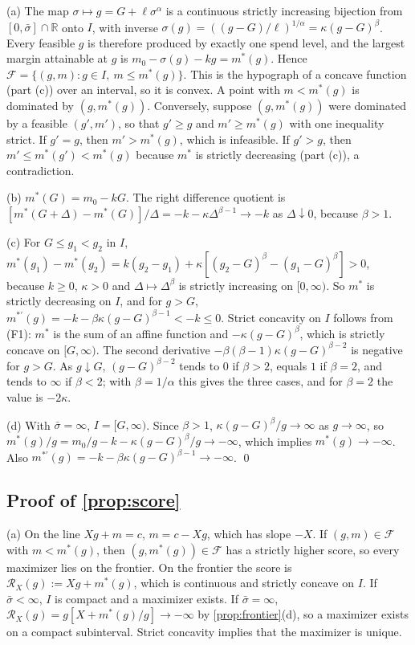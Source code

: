 (a) The map $\sigma\mapsto g=G+\ell\sigma^{\alpha}$ is a continuous strictly increasing bijection from $[0,\bar\sigma]\cap\mathbb R$ onto $I$, with inverse $\sigma(g)=((g-G)/\ell)^{1/\alpha}=\kappa(g-G)^{\beta}$. Every feasible $g$ is therefore produced by exactly one spend level, and the largest margin attainable at $g$ is $m_0-\sigma(g)-kg=m^*(g)$. Hence $\mathcal F=\{(g,m):g\in I,\ m\le m^*(g)\}$. This is the hypograph of a concave function (part (c)) over an interval, so it is convex. A point with $m<m^*(g)$ is dominated by $(g,m^*(g))$. Conversely, suppose $(g,m^*(g))$ were dominated by a feasible $(g',m')$, so that $g'\ge g$ and $m'\ge m^*(g)$ with one inequality strict. If $g'=g$, then $m'>m^*(g)$, which is infeasible. If $g'>g$, then $m'\le m^*(g')<m^*(g)$ because $m^*$ is strictly decreasing (part (c)), a contradiction.

(b) $m^*(G)=m_0-kG$. The right difference quotient is $[m^*(G+\Delta)-m^*(G)]/\Delta=-k-\kappa\Delta^{\beta-1}\to -k$ as $\Delta\downarrow 0$, because $\beta>1$.

(c) For $G\le g_1<g_2$ in $I$, $m^*(g_1)-m^*(g_2)=k(g_2-g_1)+\kappa[(g_2-G)^{\beta}-(g_1-G)^{\beta}]>0$, because $k\ge 0$, $\kappa>0$ and $\Delta\mapsto\Delta^{\beta}$ is strictly increasing on $[0,\infty)$. So $m^*$ is strictly decreasing on $I$, and for $g>G$, $m^{*\prime}(g)=-k-\beta\kappa(g-G)^{\beta-1}<-k\le 0$. Strict concavity on $I$ follows from (F1): $m^*$ is the sum of an affine function and $-\kappa(g-G)^{\beta}$, which is strictly concave on $[G,\infty)$. The second derivative $-\beta(\beta-1)\kappa(g-G)^{\beta-2}$ is negative for $g>G$. As $g\downarrow G$, $(g-G)^{\beta-2}$ tends to $0$ if $\beta>2$, equals $1$ if $\beta=2$, and tends to $\infty$ if $\beta<2$; with $\beta=1/\alpha$ this gives the three cases, and for $\beta=2$ the value is $-2\kappa$.

(d) With $\bar\sigma=\infty$, $I=[G,\infty)$. Since $\beta>1$, $\kappa(g-G)^{\beta}/g\to\infty$ as $g\to\infty$, so $m^*(g)/g=m_0/g-k-\kappa(g-G)^{\beta}/g\to-\infty$, which implies $m^*(g)\to-\infty$. Also $m^{*\prime}(g)=-k-\beta\kappa(g-G)^{\beta-1}\to-\infty$. \qed

\subsection*{Proof of \autoref{prop:score}}

(a) On the line $Xg+m=c$, $m=c-Xg$, which has slope $-X$. If $(g,m)\in\mathcal F$ with $m<m^*(g)$, then $(g,m^*(g))\in\mathcal F$ has a strictly higher score, so every maximizer lies on the frontier. On the frontier the score is $\mathcal R_X(g):=Xg+m^*(g)$, which is continuous and strictly concave on $I$. If $\bar\sigma<\infty$, $I$ is compact and a maximizer exists. If $\bar\sigma=\infty$, $\mathcal R_X(g)=g[X+m^*(g)/g]\to-\infty$ by \autoref{prop:frontier}(d), so a maximizer exists on a compact subinterval. Strict concavity implies that the maximizer is unique.

